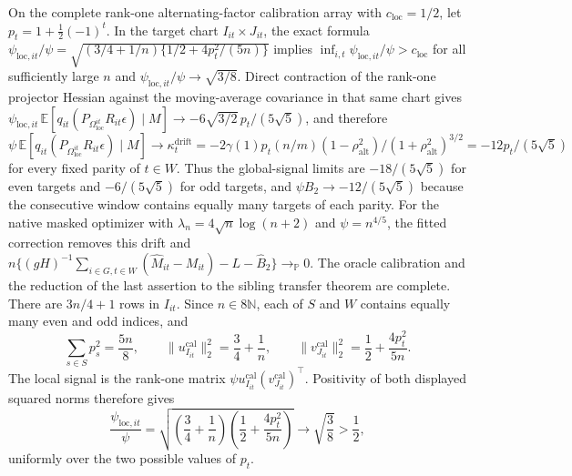On the complete rank-one alternating-factor calibration array with \(c_{\mathrm{loc}}=1/2\), let \(p_t=1+\tfrac12(-1)^t\). In the target chart \(I_{it}\times J_{it}\), the exact formula \(\psi_{\mathrm{loc},it}/\psi=\sqrt{(3/4+1/n)\{1/2+4p_t^2/(5n)\}}\) implies \(\inf_{i,t}\psi_{\mathrm{loc},it}/\psi>c_{\mathrm{loc}}\) for all sufficiently large \(n\) and \(\psi_{\mathrm{loc},it}/\psi\to\sqrt{3/8}\). Direct contraction of the rank-one projector Hessian against the moving-average covariance in that same chart gives \(\psi_{\mathrm{loc},it}\,\mathbb E[q_{it}(P_{\Omega_{\mathrm{loc}}^{it}}R_{it}\epsilon)\mid M]\to-6\sqrt{3/2}\,p_t/(5\sqrt5)\), and therefore \(\psi\,\mathbb E[q_{it}(P_{\Omega_{\mathrm{loc}}^{it}}R_{it}\epsilon)\mid M]\to\kappa^{\mathrm{drift}}_t=-2\gamma(1)p_t(n/m)(1-\rho_{\mathrm{alt}}^2)/(1+\rho_{\mathrm{alt}}^2)^{3/2}=-12p_t/(5\sqrt5)\) for every fixed parity of \(t\in W\). Thus the global-signal limits are \(-18/(5\sqrt5)\) for even targets and \(-6/(5\sqrt5)\) for odd targets, and \(\psi B_2\to-12/(5\sqrt5)\) because the consecutive window contains equally many targets of each parity. For the native masked optimizer with \(\lambda_n=4\sqrt n\log(n+2)\) and \(\psi=n^{4/5}\), the fitted correction removes this drift and \(n\{(gH)^{-1}\sum_{i\in G,t\in W}(\widehat M_{it}-M_{it})-L-\widehat B_2\}\to_{\mathbb P}0\).
The oracle calibration and the reduction of the last assertion to the sibling transfer theorem are complete.  There are \(3n/4+1\) rows in \(I_{it}\).  Since \(n\in8\mathbb N\), each of \(S\) and \(W\) contains equally many even and odd indices, and
\[
\sum_{s\in S}p_s^2=\frac{5n}{8},
\qquad
\|u^{\mathrm{cal}}_{I_{it}}\|_2^2=\frac34+\frac1n,
\qquad
\|v^{\mathrm{cal}}_{J_{it}}\|_2^2=\frac12+\frac{4p_t^2}{5n}.
\]
The local signal is the rank-one matrix \(\psi u^{\mathrm{cal}}_{I_{it}}(v^{\mathrm{cal}}_{J_{it}})^\top\).  Positivity of both displayed squared norms therefore gives
\[
\frac{\psi_{\mathrm{loc},it}}{\psi}
=
\sqrt{\left(\frac34+\frac1n\right)
\left(\frac12+\frac{4p_t^2}{5n}\right)}
\longrightarrow\sqrt{\frac38}>\frac12,
\]
uniformly over the two possible values of \(p_t\).

